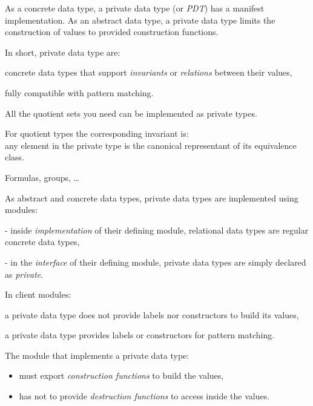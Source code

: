 
As a concrete data type, a private data type (or {\em PDT}) has a manifest implementation.
As an abstract data type, a private data type limits the construction of
values to provided construction functions.

In short, private data type are:
\begin{citemize}
\item concrete data types that support {\em invariants} or {\em relations}
between their values,
\item fully compatible with pattern matching.
\end{citemize}


All the quotient sets you need can be implemented as private types.

For quotient types the corresponding invariant is:\\
any element in the private type is the canonical representant of its
equivalence class.

Formulas, groups, \ldots


As abstract and concrete data types, private data types are implemented using modules:

- inside {\em implementation} of their defining module, relational data types
are regular concrete data types,

- in the {\em interface} of their defining module, private data types are simply
declared as {\em private}.


In client modules:\\
\begin{citemize}
  \item a private data type does not provide labels nor constructors to build its values,
  \item a private data type provides labels or constructors for pattern matching.
\end{citemize}


The module that implements a private data type:

\begin{itemize}
 \item must export {\em construction functions} to build the values,
 \item has not to provide {\em destruction functions} to access inside
the values.
\end{itemize}

